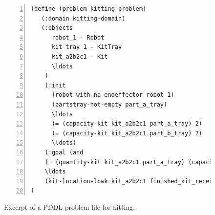 \begin{figure}[t!h!]
\begin{minipage}{.7\paperwidth}
\begin{list}{}{\setlength{\leftmargin}{1em}}\item\small
\begin{Verbatim}[commandchars=\\\{\},fontsize=\scriptsize, numbers=left, numbersep=2pt]
(define (problem kitting-problem)
   (:domain kitting-domain)
   (:objects
      robot_1 - Robot
      kit_tray_1 - KitTray
      kit_a2b2c1 - Kit
      \ldots
	)
    (:init
      (robot-with-no-endeffector robot_1)
      (partstray-not-empty part_a_tray)
      \ldots
      (= (capacity-kit kit_a2b2c1 part_a_tray) 2)
      (= (capacity-kit kit_a2b2c1 part_b_tray) 2)
      \ldots)
    (:goal (and
    (= (quantity-kit kit_a2b2c1 part_a_tray) (capacity-kit kit_a2b2c1 part_a_tray))
    \ldots
    (kit-location-lbwk kit_a2b2c1 finished_kit_receiver))
)
\end{Verbatim}
\end{list}
\end{minipage}
\caption{Excerpt of a PDDL problem file for kitting.}
\label{fig:problem}
\end{figure}

